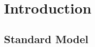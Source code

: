 \documentclass{beamer}
\begin{document}
  \section{Introduction}
    \subsection{Standard Model}



\end{document}
